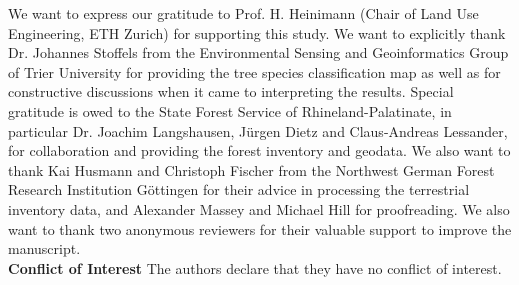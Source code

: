 \documentclass[twocolumn, draft]{svjour3}     %
\begin{document}




















\begin{acknowledgements}
We want to express our gratitude to Prof. H. Heinimann (Chair of Land Use Engineering, ETH Zurich) for supporting this study. We want to explicitly thank Dr. Johannes Stoffels from the Environmental Sensing and Geoinformatics Group of Trier University for providing the tree species classification map as well as for constructive discussions when it came to interpreting the results. Special gratitude is owed to the State Forest Service of Rhineland-Palatinate, in particular Dr. Joachim Langshausen, Jürgen Dietz and Claus-Andreas Lessander, for collaboration and providing the forest inventory and geodata. We also want to thank Kai Husmann and Christoph Fischer from the Northwest German Forest Research Institution Göttingen for their advice in processing the terrestrial inventory data, and Alexander Massey and Michael Hill for proofreading. We also want to thank two anonymous reviewers for their valuable support to improve the manuscript.\\

\noindent \textbf{Conflict of Interest} The authors declare that they have no conflict of interest.

\end{acknowledgements}




\end{document}
